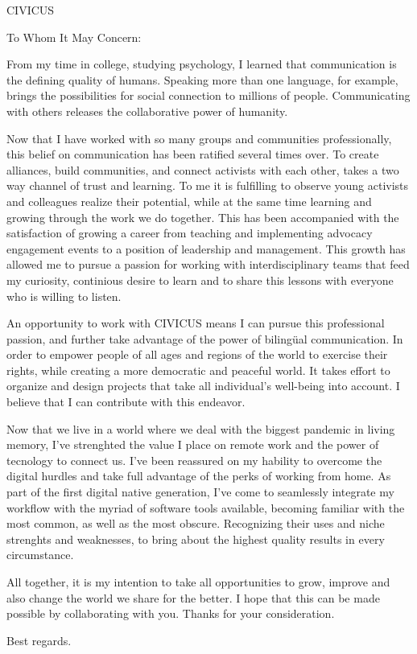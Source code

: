 \documentclass[draft=true]{scrlttr2}
\begin{document}
    \begin{letter}{CIVICUS}

\opening{To Whom It May Concern:}

From my time in college, studying psychology, I learned that communication is the defining quality of humans. Speaking more than one language, for example, brings the possibilities for social connection to millions of people. Communicating with others releases the collaborative power of humanity.

Now that I have worked with so many groups and communities professionally, this belief on communication has been ratified several times over. To create alliances, build communities, and connect activists with each other, takes a two way channel of trust and learning. To me it is fulfilling to observe young activists and colleagues realize their potential, while at the same time learning and growing through the work we do together. This has been accompanied with the satisfaction of growing a career from teaching and implementing advocacy engagement events to a position of leadership and management. This growth has allowed me to pursue a passion for working with interdisciplinary teams that feed my curiosity, continious desire to learn and to share this lessons with everyone who is willing to listen.

An opportunity to work with CIVICUS means I can pursue this professional passion, and further take advantage of the power of bilingüal communication. In order to empower people of all ages and regions of the world to exercise their rights, while creating a more democratic and peaceful world. It takes effort to organize and design projects that take all individual's well-being into account. I believe that I can contribute with this endeavor.

Now that we live in a world where we deal with the biggest pandemic in living memory, I've strenghted the value I place on remote work and the power of tecnology to connect us. I've been reassured on my hability to overcome the digital hurdles and take full advantage of the perks of working from home. As part of the first digital native generation, I've come to seamlessly integrate my workflow with the myriad of software tools available, becoming familiar with the most common, as well as the most obscure. Recognizing their uses and niche strenghts and weaknesses, to bring about the highest quality results in every circumstance.

All together, it is my intention to take all opportunities to grow, improve and also change the world we share for the better. I hope that this can be made possible by collaborating with you. Thanks for your consideration.

\closing{Best regards.}

    \end{letter}
\end{document}

